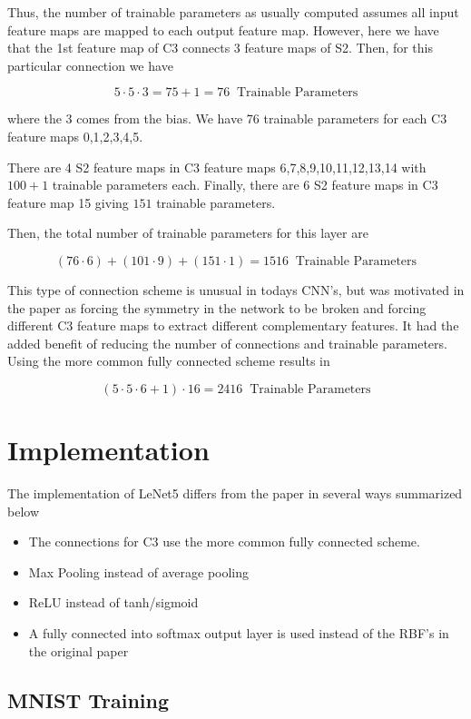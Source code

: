 \documentclass[11pt]{article}
\theoremstyle{definition}
\begin{document}
Thus, the number of trainable parameters as usually computed assumes all input feature maps are mapped to each output feature map. However, here we have that the 1st feature map of C3 connects 3 feature maps of S2. Then, for this particular connection we have

\[ 5 \cdot 5 \cdot 3 = 75 + 1 = 76 \; \; \text{Trainable Parameters} \]

where the 3 comes from the bias. We have 76 trainable parameters for each C3 feature maps 0,1,2,3,4,5.

There are 4 S2 feature maps in C3 feature maps 6,7,8,9,10,11,12,13,14 with $100 + 1$ trainable parameters each. Finally, there are 6 S2 feature maps in C3 feature map 15 giving $151$ trainable parameters.

Then, the total number of trainable parameters for this layer are 

\[ (76 \cdot 6) + (101 \cdot 9) + (151 \cdot 1) = 1516 \; \; \text{Trainable Parameters}\]

\bigskip

This type of connection scheme is unusual in todays CNN's, but was motivated in the paper as forcing the symmetry in the network to be broken and forcing different C3 feature maps to extract different complementary features. It had the added benefit of reducing the number of connections and trainable parameters. Using the more common fully connected scheme results in 

\[ (5 \cdot 5 \cdot 6 + 1) \cdot 16 = 2416 \; \; \text{Trainable Parameters}\]

\newpage
\section{Implementation}

The implementation of LeNet5 differs from the paper in several ways summarized below
\begin{itemize}
\item The connections for C3 use the more common fully connected scheme.
\item Max Pooling instead of average pooling
\item ReLU instead of tanh/sigmoid
\item A fully connected into softmax output layer is used instead of the RBF's in the original paper
\end{itemize}

\subsection{MNIST Training}
\end{document}
